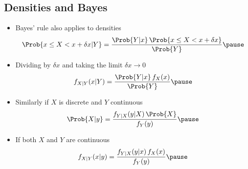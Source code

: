
\begin{slide}
\section[-2]{Densities and Bayes}

\begin{PauseHighLight}\squeeze
  \begin{itemize}
  \item Bayes' rule also applies to densities
    {\small \begin{align*}
      \Prob{x\leq X < x +\delta x| Y} = \frac{\Prob{Y | x} \,
      \Prob{x\leq X < x +\delta x}}{\Prob{Y}}\pause
    \end{align*}}
  \item Dividing by $\delta x$ and taking the limit $\delta x\rightarrow
    0$
    {\small \begin{align*}
      f_{X|Y}(x|Y) = \frac{\Prob{Y|x}\,f_X(x)}{\Prob{Y}}\pause
    \end{align*}}
  \item Similarly if $X$ is discrete and $Y$ continuous
    {\small \begin{align*}
      \Prob{X|y} = \frac{f_{Y|X}(y|X)\,\Prob{X}}{f_Y(y)}\pause
    \end{align*}}
  \item If both $X$ and $Y$ are continuous
    {\small \begin{align*}
      f_{X|Y}(x|y) = \frac{f_{Y|X}(y|x)\,f_X(x)}{f_Y(y)}\pause
    \end{align*}}
  \end{itemize}
\end{PauseHighLight}
\end{slide}


